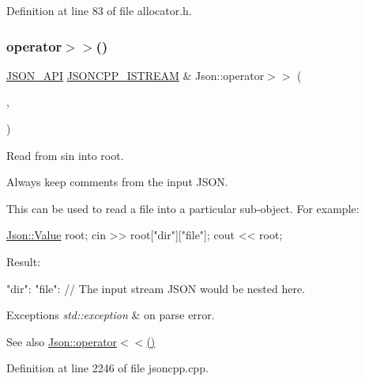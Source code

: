 Definition at line 83 of file allocator.\+h.

\hypertarget{namespace_json_a01f08004efa8a401e01ebd17be77dc71}{}\label{namespace_json_a01f08004efa8a401e01ebd17be77dc71} 
\subsubsection{\texorpdfstring{operator$>$$>$()}{operator>>()}}
{\footnotesize\ttfamily \hyperlink{config_8h_a1d61ffde86ce1a18fd83194ff0d9a206}{J\+S\+O\+N\+\_\+\+A\+PI} \hyperlink{config_8h_a15f2f70b2ce0a2abd0f8112393dbc4de}{J\+S\+O\+N\+C\+P\+P\+\_\+\+I\+S\+T\+R\+E\+AM} \& Json\+::operator$>$$>$ (\begin{DoxyParamCaption}\item[{\hyperlink{config_8h_a15f2f70b2ce0a2abd0f8112393dbc4de}{J\+S\+O\+N\+C\+P\+P\+\_\+\+I\+S\+T\+R\+E\+AM} \&}]{,  }\item[{\hyperlink{class_json_1_1_value}{Value} \&}]{ }\end{DoxyParamCaption})}



Read from \textquotesingle{}sin\textquotesingle{} into \textquotesingle{}root\textquotesingle{}. 

Always keep comments from the input J\+S\+ON.

This can be used to read a file into a particular sub-\/object. For example\+: 
\begin{DoxyCode}
\hyperlink{class_json_1_1_value}{Json::Value} root;
cin >> root[\textcolor{stringliteral}{"dir"}][\textcolor{stringliteral}{"file"}];
cout << root;
\end{DoxyCode}
 Result\+: \begin{DoxyVerb}{
"dir": {
    "file": {
    // The input stream JSON would be nested here.
    }
}
}
\end{DoxyVerb}
 
\begin{DoxyExceptions}{Exceptions}
{\em std\+::exception} & on parse error. \\
\hline
\end{DoxyExceptions}
\begin{DoxySeeAlso}{See also}
\hyperlink{namespace_json_a845a15902e500af8eee19e729a17b863}{Json\+::operator$<$$<$()} 
\end{DoxySeeAlso}


Definition at line 2246 of file jsoncpp.\+cpp.

